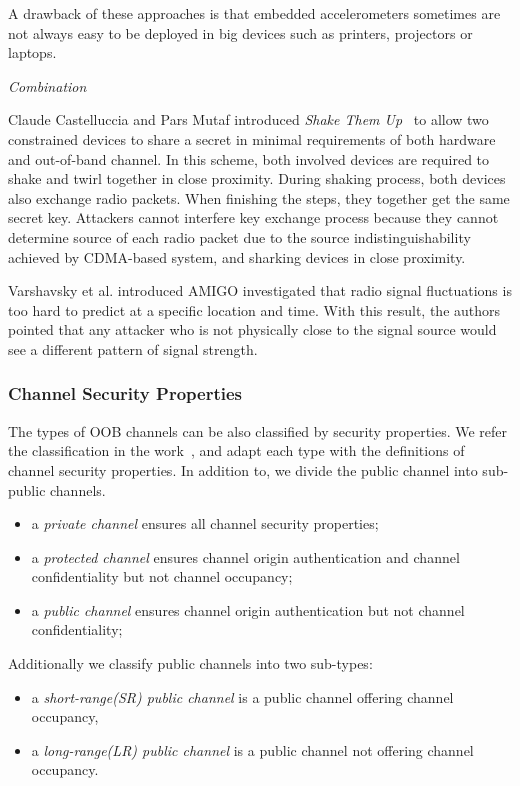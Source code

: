 A drawback of these approaches is that embedded accelerometers sometimes are not always easy to be deployed in big devices such as printers, projectors or laptops.

\emph{Combination}

Claude Castelluccia and Pars Mutaf introduced \emph{Shake Them Up}~\cite{Castelluccia:2005} to allow two constrained devices to share a secret in minimal requirements of both hardware and out-of-band channel. In this scheme, both involved devices are required to shake and twirl together in close proximity. During shaking process, both devices also exchange radio packets. When finishing the steps, they together get the same secret key. Attackers cannot interfere key exchange process because they cannot determine source of each radio packet due to the source indistinguishability achieved by CDMA-based system, and sharking devices in close proximity. 

Varshavsky et al. introduced AMIGO \cite{Scannell07amigo:proximity-based} investigated that radio signal fluctuations is too hard to predict at a specific location and time. With this result, the authors pointed that any attacker who is not physically close to the signal source would see a different pattern of signal strength. 

\subsubsection{Channel Security Properties}

The types of OOB channels can be also classified by security properties. We refer the classification in the work~\cite{6687314}, and adapt each type with the definitions of channel security properties. In addition to, we divide the public channel into sub-public channels. 
\begin{itemize}
 \item a \textit{private channel} ensures all channel security properties;
 \item a \textit{protected channel} ensures channel origin authentication and channel confidentiality but not channel occupancy;
 \item a \textit{public channel} ensures channel origin authentication but not channel confidentiality;
\end{itemize}

Additionally we classify public channels into two sub-types: 
\begin{itemize}
 \item a \textit{short-range(SR) public channel} is a public channel offering channel occupancy,
 \item a \textit{long-range(LR) public channel} is a public channel not offering channel occupancy.
\end{itemize}

